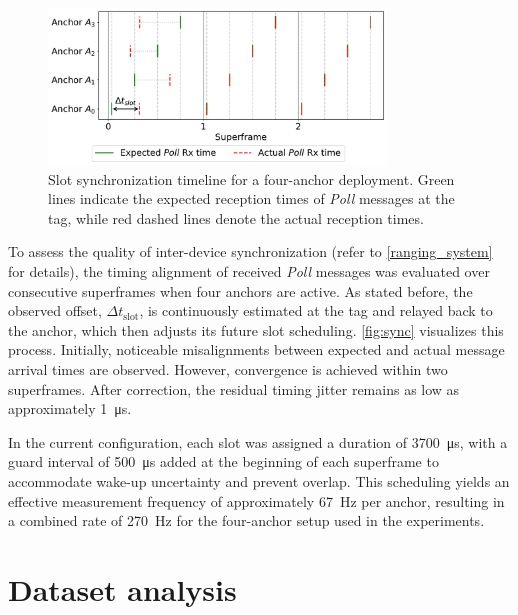 \begin{figure}[tbh]
    \centering
    \includegraphics[width=0.8\textwidth]{Figures/experiments_and_results/sync_visualize.pdf}
    \caption[Slot synchronization timeline for a four-anchor deployment.]{Slot synchronization timeline for a four-anchor deployment. Green lines indicate the expected reception times of \textit{Poll} messages at the tag, while red dashed lines denote the actual reception times.}
    \label{fig:sync}
\end{figure}

To assess the quality of inter-device synchronization (refer to \autoref{ranging_system} for details), the timing alignment of received \textit{Poll} messages was evaluated over consecutive superframes when four anchors are active. As stated before, the observed offset, $\Delta t_{\text{slot}}$, is continuously estimated at the tag and relayed back to the anchor, which then adjusts its future slot scheduling. \autoref{fig:sync} visualizes this process. Initially, noticeable misalignments between expected and actual message arrival times are observed. However, convergence is achieved within two superframes. After correction, the residual timing jitter remains as low as approximately \SI{1}{\micro\second}.

In the current configuration, each slot was assigned a duration of \SI{3700}{\micro\second}, with a guard interval of \SI{500}{\micro\second} added at the beginning of each superframe to accommodate wake-up uncertainty and prevent overlap. This scheduling yields an effective measurement frequency of approximately \SI{67}{\hertz} per anchor, resulting in a combined rate of \SI{270}{\hertz} for the four-anchor setup used in the experiments.

\section{Dataset analysis}

